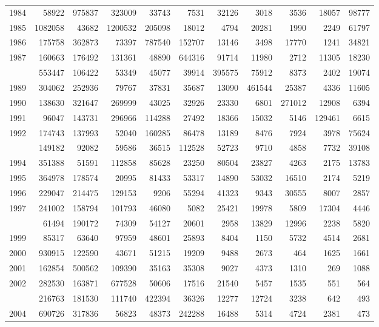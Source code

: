 \documentclass[
]{article}
\begin{document}
\begin{longtable}[t]{lrrrrrrrrrr}
1984 & 58922 & 975837 & 323009 & 33743 & 7531 & 32126 & 3018 & 3536 & 18057 & 98777\\
1985 & 1082058 & 43682 & 1200532 & 205098 & 18012 & 4794 & 20281 & 1990 & 2249 & 61797\\
1986 & 175758 & 362873 & 73397 & 787540 & 152707 & 13146 & 3498 & 17770 & 1241 & 34821\\
1987 & 160663 & 176492 & 131361 & 48890 & 644316 & 91714 & 11980 & 2712 & 11305 & 18230\\
\addlinespace
1988 & 553447 & 106422 & 53349 & 45077 & 39914 & 395575 & 75912 & 8373 & 2402 & 19074\\
1989 & 304062 & 252936 & 79767 & 37831 & 35687 & 13090 & 461544 & 25387 & 4336 & 11605\\
1990 & 138630 & 321647 & 269999 & 43025 & 32926 & 23330 & 6801 & 271012 & 12908 & 6394\\
1991 & 96047 & 143731 & 296966 & 114288 & 27492 & 18366 & 15032 & 5146 & 129461 & 6615\\
1992 & 174743 & 137993 & 52040 & 160285 & 86478 & 13189 & 8476 & 7924 & 3978 & 75624\\
\addlinespace
1993 & 149182 & 92082 & 59586 & 36515 & 112528 & 52723 & 9710 & 4858 & 7732 & 39108\\
1994 & 351388 & 51591 & 112858 & 85628 & 23250 & 80504 & 23827 & 4263 & 2175 & 13783\\
1995 & 364978 & 178574 & 20995 & 81433 & 53317 & 14890 & 53032 & 16510 & 2174 & 5219\\
1996 & 229047 & 214475 & 129153 & 9206 & 55294 & 41323 & 9343 & 30555 & 8007 & 2857\\
1997 & 241002 & 158794 & 101793 & 46080 & 5082 & 25421 & 19978 & 5809 & 17304 & 4446\\
\addlinespace
1998 & 61494 & 190172 & 74309 & 54127 & 20601 & 2958 & 13829 & 12996 & 2238 & 5820\\
1999 & 85317 & 63640 & 97959 & 48601 & 25893 & 8404 & 1150 & 5732 & 4514 & 2681\\
2000 & 930915 & 122590 & 43671 & 51215 & 19209 & 9488 & 2673 & 464 & 1625 & 1661\\
2001 & 162854 & 500562 & 109390 & 35163 & 35308 & 9027 & 4373 & 1310 & 269 & 1088\\
2002 & 282530 & 163871 & 677528 & 50606 & 17516 & 21540 & 5457 & 1535 & 551 & 564\\
\addlinespace
2003 & 216763 & 181530 & 111740 & 422394 & 36326 & 12277 & 12724 & 3238 & 642 & 493\\
2004 & 690726 & 317836 & 56823 & 48373 & 242288 & 16488 & 5314 & 4724 & 2381 & 473\\

\end{longtable}
\end{document}
